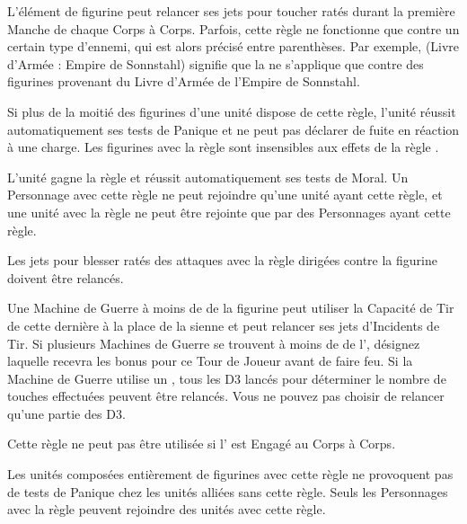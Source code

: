 
L'élément de figurine peut relancer ses jets pour toucher ratés durant la première Manche de chaque Corps à Corps. Parfois, cette règle ne fonctionne que contre un certain type d'ennemi, qui est alors précisé entre parenthèses. Par exemple, \og \hatred{} (Livre d'Armée : Empire de Sonnstahl) \fg{} signifie que la \hatred{} ne s'applique que contre des figurines provenant du Livre d'Armée de l'Empire de Sonnstahl.


Si plus de la moitié des figurines d'une unité dispose de cette règle, l'unité réussit automatiquement ses tests de Panique et ne peut pas déclarer de fuite en réaction à une charge. Les figurines avec la règle \immunetopsychology{} sont insensibles aux effets de la règle \fear{}.


L'unité gagne la règle \immunetopsychology{} et réussit automatiquement ses tests de Moral. Un Personnage avec cette règle ne peut rejoindre qu'une unité ayant cette règle, et une unité avec la règle \unbreakable{} ne peut être rejointe que par des Personnages ayant cette règle.


Les jets pour blesser ratés des attaques avec la règle \flamingattacks{} dirigées contre la figurine doivent être relancés.


Une Machine de Guerre à moins de  de la figurine peut utiliser la Capacité de Tir de cette dernière à la place de la sienne et peut relancer ses jets d'Incidents de Tir. Si plusieurs Machines de Guerre se trouvent à moins de  de l'\engineer{}, désignez laquelle recevra les bonus pour ce Tour de Joueur avant de faire feu. Si la Machine de Guerre utilise un \flamethrower{}, tous les D3 lancés pour déterminer le nombre de touches effectuées peuvent être relancés. Vous ne pouvez pas choisir de relancer qu'une partie des D3.

Cette règle ne peut pas être utilisée si l'\engineer{} est Engagé au Corps à Corps.


Les unités composées entièrement de figurines avec cette règle ne provoquent pas de tests de Panique chez les unités alliées sans cette règle. Seuls les Personnages avec la règle \insignificant{} peuvent rejoindre des unités avec cette règle.

